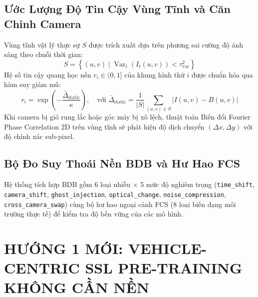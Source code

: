 \documentclass[11pt,a4paper]{article}
\begin{document}
\subsection{Ước Lượng Độ Tin Cậy Vùng Tĩnh và Căn Chỉnh Camera}
Vùng tĩnh vật lý thực sự $S$ được trích xuất dựa trên phương sai cường độ ánh sáng theo chuỗi thời gian:
\begin{equation}
    S = \left\{(u, v) \mid \operatorname{Var}_{t}(I_t(u, v)) < \tau_{\text{var}}^2 \right\}
\end{equation}
Hệ số tin cậy quang học nền $r_i \in (0, 1]$ của khung hình thứ $i$ được chuẩn hóa qua hàm suy giảm mũ:
\begin{equation}
    r_i = \exp\left( -\frac{\bar{\Delta}_{\text{static}}}{\kappa} \right), \quad \text{với } \bar{\Delta}_{\text{static}} = \frac{1}{|S|} \sum_{(u, v) \in S} |I(u, v) - B(u, v)|
\end{equation}
Khi camera bị gió rung lắc hoặc góc máy bị xô lệch, thuật toán Biến đổi Fourier Phase Correlation 2D trên vùng tĩnh sẽ phát hiện độ dịch chuyển $(\Delta x, \Delta y)$ với độ chính xác sub-pixel.

\subsection{Bộ Đo Suy Thoái Nền BDB và Hư Hao FCS}
Hệ thống tích hợp BDB gồm 6 loại nhiễu $\times$ 5 mức độ nghiêm trọng (\texttt{time\_shift}, \texttt{camera\_shift}, \texttt{ghost\_injection}, \texttt{optical\_change}, \texttt{noise\_compression}, \texttt{cross\_camera\_swap}) cùng bộ hư hao ngoại cảnh FCS (8 loại biến dạng môi trường thực tế) để kiểm tra độ bền vững của các mô hình.

\section{HƯỚNG 1 MỚI: VEHICLE-CENTRIC SSL PRE-TRAINING KHÔNG CẦN NỀN}
\end{document}
